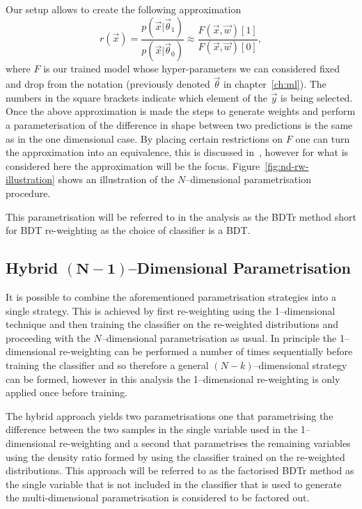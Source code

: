 Our setup allows to create the following approximation
\begin{equation}
  r(\vec{x}) =  \frac{p(\vec{x}|\vec{\theta}_{1})}{p(\vec{x}|\vec{\theta}_{0})}
  \approx \frac{F(\vec{x}, \vec{w})[1]}{F(\vec{x}, \vec{w})[0]},
  \label{eq:bdtr-approximation}
\end{equation}
where $F$ is our trained model whose hyper-parameters we can considered fixed
and drop from the notation (previously denoted $\vec{\theta}$ in
chapter~\ref{ch:ml}). The numbers in the square brackets indicate which element
of the $\vec{y}$ is being selected. Once the above approximation is made the
steps to generate weights and perform a parameterisation of the difference in
shape between two predictions is the same as in the one dimensional case. By
placing certain restrictions on $F$ one can turn the approximation into an
equivalence, this is discussed in~\cite{VHModellingNote2019}, however for what
is considered here the approximation will be the focus.
Figure~\ref{fig:nd-rw-illustration} shows an illustration of the
$N$--dimensional parametrisation procedure.

This parametrisation will be referred to in the analysis as the BDTr method
short for BDT re-weighting as the choice of classifier is a BDT.

\subsection{Hybrid $\bm{(N - 1)}$--Dimensional Parametrisation}
\label{sec:hybrid-reweight}

It is possible to combine the aforementioned parametrisation strategies into a
single strategy. This is achieved by first re-weighting using the 1--dimensional
technique and then training the classifier on the re-weighted distributions and
proceeding with the $N$--dimensional parametrisation as usual. In principle the
1--dimensional re-weighting can be performed a number of times sequentially
before training the classifier and so therefore a general $(N-k)$--dimensional
strategy can be formed, however in this analysis the 1--dimensional re-weighting
is only applied once before training.

The hybrid approach yields two parametrisations one that parametrising the
difference between the two samples in the single variable used in the
1--dimensional re-weighting and a second that parametrises the remaining
variables using the density ratio formed by using the classifier trained on the
re-weighted distributions. This approach will be referred to as the factorised
BDTr method as the single variable that is not included in the classifier that
is used to generate the multi-dimensional parametrisation is considered to be
factored out.

